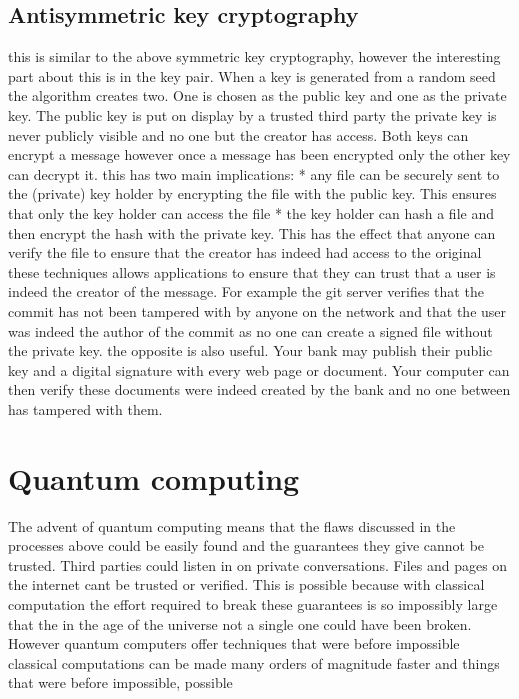 \documentclass[12pt]{article}
\begin{document}
\subsection{Antisymmetric key cryptography}
this is similar to the above symmetric key cryptography, however the
interesting part about this is in the key pair. When a key is generated
from a random seed the algorithm creates two. One is chosen as the public
key and one as the private key. The public key is put on display by a
trusted third party the private key is never publicly visible and no one
but the creator has access. Both keys can encrypt a message however
once a message has been encrypted only the other key can decrypt it.
this has two main implications:
  *  any file can be securely sent to the (private) key holder by
     encrypting the file with the public key. This ensures that
     only the key holder can access the file
  *  the key holder can hash a file and then encrypt the hash with the
     private key. This has the effect that anyone can verify the file
     to ensure that the creator has indeed had access to the original
these techniques allows applications to ensure that they can trust that
a user is indeed the creator of the message. For example the git server
verifies that the commit has not been tampered with by anyone on the network
and that the user was indeed the author of the commit as no one can create
a signed file without the private key.
the opposite is also useful. Your bank may publish their public key and
a digital signature with every web page or document. Your computer can then
verify these documents were indeed created by the bank and no one between
has tampered with them.

\section{Quantum computing}
The advent of quantum computing means that the flaws discussed in the
processes above could be easily found and the guarantees they give cannot
be trusted. Third parties could listen in on private conversations. 
Files and pages on the internet cant be trusted or verified. This is possible
because with classical computation the effort required to break these guarantees
is so impossibly large that the in the age of the universe not a single one
could have been broken. However quantum computers offer techniques that
were before impossible classical computations can be made many orders 
of magnitude faster and things that were before impossible, possible
\end{document}
